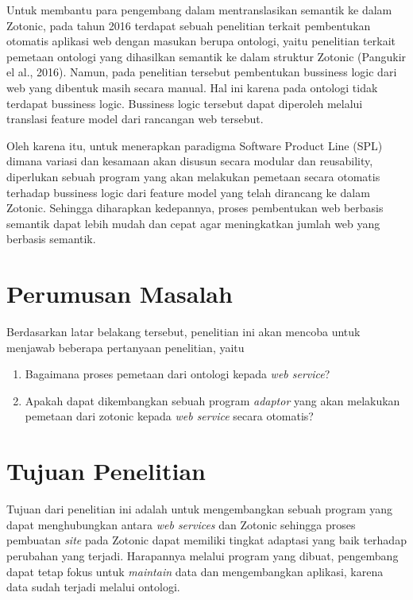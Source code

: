 Untuk membantu para pengembang dalam mentranslasikan semantik ke dalam Zotonic, pada tahun 2016 terdapat sebuah penelitian terkait pembentukan otomatis aplikasi web dengan masukan berupa ontologi, yaitu penelitian terkait pemetaan ontologi yang dihasilkan semantik ke dalam struktur Zotonic (Pangukir el al., 2016). Namun, pada penelitian tersebut pembentukan bussiness logic dari web yang dibentuk masih secara manual. Hal ini karena pada ontologi tidak terdapat bussiness logic. Bussiness logic tersebut dapat diperoleh melalui translasi feature model dari rancangan web tersebut.

Oleh karena itu, untuk menerapkan paradigma Software Product Line (SPL) dimana variasi dan kesamaan akan disusun secara modular dan reusability, diperlukan sebuah program yang akan melakukan pemetaan secara otomatis terhadap bussiness logic dari feature model yang telah dirancang ke dalam Zotonic. Sehingga diharapkan kedepannya, proses pembentukan web berbasis semantik dapat lebih mudah dan cepat agar meningkatkan jumlah web yang berbasis semantik.

\section{Perumusan Masalah}
Berdasarkan latar belakang tersebut, penelitian ini akan mencoba untuk menjawab beberapa pertanyaan penelitian, yaitu
\begin{enumerate}
\item Bagaimana proses pemetaan dari ontologi kepada \textit{web service}?
\item Apakah dapat dikembangkan sebuah program \textit{adaptor} yang akan melakukan pemetaan dari zotonic kepada \textit{web service} secara otomatis?
\end{enumerate}
\section{Tujuan Penelitian}
Tujuan dari penelitian ini adalah untuk mengembangkan sebuah program yang dapat menghubungkan antara \textit{web services} dan Zotonic sehingga proses pembuatan \textit{site} pada Zotonic dapat memiliki tingkat adaptasi yang baik terhadap perubahan yang terjadi. Harapannya melalui program yang dibuat, pengembang dapat tetap fokus untuk \textit{maintain} data dan mengembangkan aplikasi, karena data sudah terjadi melalui ontologi.

